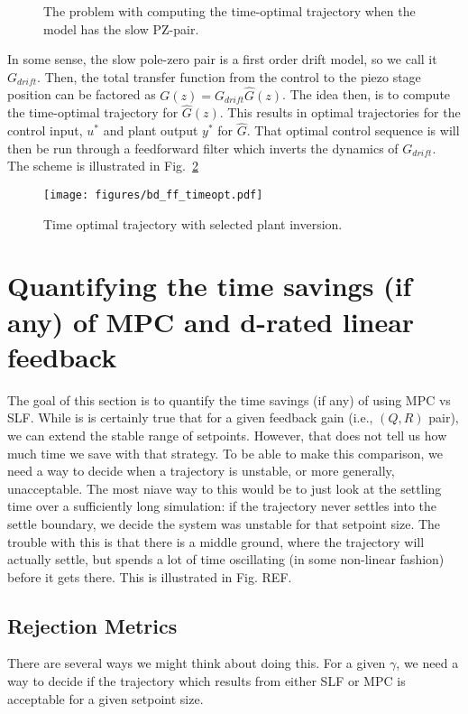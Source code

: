 \documentclass[journal,twocolumn,twoside]{IEEEtran/IEEEtran}
\begin{document}
\begin{figure}
  \centering
  
  
  \caption{The problem with computing the time-optimal trajectory when the model has the slow PZ-pair.}
  \label{fig:slowpz_to}
\end{figure}
In some sense, the slow pole-zero pair is a first order drift model, so we call it $G_{drift}$. Then, the total transfer function from the control to the piezo stage position can be factored as $G(z) = G_{drift}\hat{G}(z)$. The idea then, is to compute the time-optimal trajectory for $\hat{G}(z)$. This results in optimal trajectories for the control input, $u^*$ and plant output $y^*$ for $\hat{G}$. That optimal control sequence is will then be run through a feedforward filter which inverts the dynamics of $G_{drift}$. The scheme is illustrated in Fig.~\ref{fig:bd_ff_to}
\begin{figure}
  \centering
  \texttt{[image: figures/bd\_ff\_timeopt.pdf]}
  \caption{Time optimal trajectory with selected plant inversion.}
  \label{fig:bd_ff_to}
\end{figure}


\section{Quantifying the time savings (if any) of MPC and d-rated linear feedback}
\label{sec:org7edf36d}
The goal of this section is to quantify the time savings (if any) of using MPC vs SLF. While is is certainly true that for a given feedback gain (i.e., $(Q,R)$ pair), we can extend the stable range of setpoints. However, that does not tell us how much time we save with that strategy. To be able to make this comparison, we need a way to decide when a trajectory is unstable, or more generally, unacceptable. The most niave way to this would be to just look at the settling time over a sufficiently long simulation: if the trajectory never settles into the settle boundary, we decide the system was unstable for that setpoint size. The trouble with this is that there is a middle ground, where the trajectory will actually settle, but spends a lot of time oscillating (in some non-linear fashion) before it gets there. This is illustrated in Fig. REF.


\subsection{Rejection Metrics}\label{sec:metrics}
There are several ways we might think about doing this. 
For a given $\gamma$, we need a way to decide if the trajectory which results from either SLF or MPC is acceptable for a given setpoint size.
\end{document}
